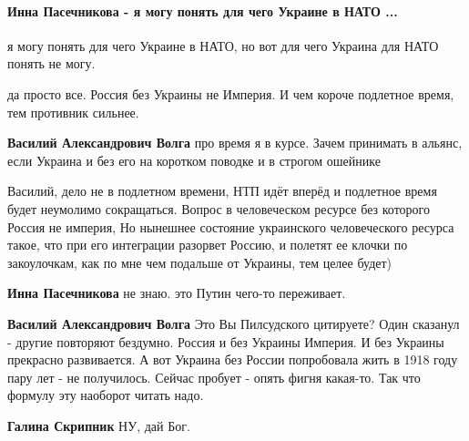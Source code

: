 
 
 
 
 
\paragraph{Инна Пасечникова - я могу понять для чего Украине в НАТО ...}

\begin{itemize} %

я могу понять для чего Украине в НАТО, но вот для чего Украина для НАТО понять не могу.

\begin{itemize} %
да просто все. Россия без Украины не Империя. И чем короче подлетное время, тем противник сильнее.

\textbf{Василий Александрович Волга} про время я в курсе. Зачем принимать в альянс, если Украина и без его на коротком поводке и в строгом ошейнике


Василий, дело не в подлетном времени, НТП идёт вперёд и подлетное время будет неумолимо сокращаться.
Вопрос в человеческом ресурсе без которого Россия не империя,
Но нынешнее состояние украинского человеческого ресурса такое, что при его интеграции разорвет Россию, и полетят ее клочки по закоулочкам, как по мне чем подальше от Украины, тем целее будет)

\textbf{Инна Пасечникова} не знаю. это Путин чего-то переживает.

\textbf{Василий Александрович Волга} Это Вы Пилсудского цитируете? Один сказанул - другие повторяют бездумно. Россия и без Украины Империя. И без Украины прекрасно развивается. А вот Украина без России попробовала жить в 1918 году пару лет - не получилось. Сейчас пробует - опять фигня какая-то. Так что формулу эту наоборот читать надо.

\textbf{Галина Скрипник} НУ, дай Бог.
\end{itemize} %


\end{itemize}
